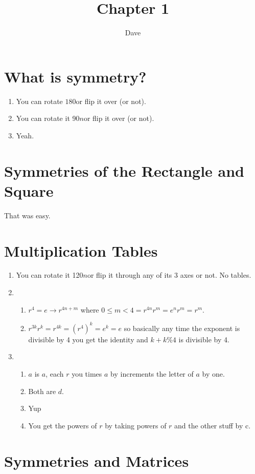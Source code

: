 \documentclass[11pt, oneside]{article}   	%
\title{Chapter 1}
\author{Dave}
\newcommand{\be}{\begin{enumerate}}
\newcommand{\ee}{\end{enumerate}}
\begin{document}
\maketitle

\section{What is symmetry?}

\be
\item You can rotate $180$\textdegree or flip it over (or not).
\item You can rotate it 90$n$\textdegree or flip it over (or not).
\item Yeah.
\ee

\section{Symmetries of the Rectangle and Square}

That was easy.

\section{Multiplication Tables}

\be
\item You can rotate it 120$n$\textdegree or flip it through any of its 3 axes or not. No tables.
\item \be
\item $r^4 = e \rightarrow r^{4n+m}$ where $0 \le m < 4 = r^{4n}r^m = e^nr^m = r^m$. 
\item $r^{3k}r^k = r^{4k} = (r^4)^k = e^k = e$ so basically any time the exponent is divisible by 4 you get the identity and $k + k \% 4$ is divisible by 4.
\ee
\item \be
\item $a$ is $a$, each $r$ you times $a$ by increments the letter of $a$ by one.
\item Both are $d$.
\item Yup
\item You get the powers of $r$ by taking powers of $r$ and the other stuff by c.
\ee
\ee

\section{Symmetries and Matrices}
\end{document}
